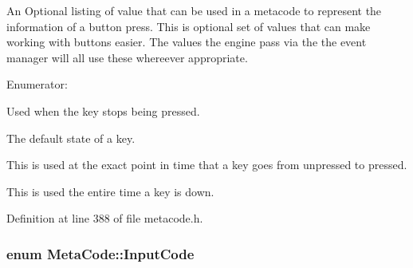 An Optional listing of value that can be used in a metacode to represent the information of a button press. This is optional set of values that can make working with buttons easier. The values the engine pass via the the event manager will all use these whereever appropriate. \begin{Desc}
\item[Enumerator: ]\par
\begin{description}
\item[{\em 
\hypertarget{classMetaCode_a8bcce67af20f4f779ba6f5387e438077aa16bc921174974d9e30752eff7af8336}{
BUTTON\_\-LIFTING}
\label{d7/d72/classMetaCode_a8bcce67af20f4f779ba6f5387e438077aa16bc921174974d9e30752eff7af8336}
}]Used when the key stops being pressed. \item[{\em 
\hypertarget{classMetaCode_a8bcce67af20f4f779ba6f5387e438077a87e2c9bdb3c969158f85543759dce244}{
BUTTON\_\-UP}
\label{d7/d72/classMetaCode_a8bcce67af20f4f779ba6f5387e438077a87e2c9bdb3c969158f85543759dce244}
}]The default state of a key. \item[{\em 
\hypertarget{classMetaCode_a8bcce67af20f4f779ba6f5387e438077a1113791ce46932b93099ba765116b0d7}{
BUTTON\_\-PRESSING}
\label{d7/d72/classMetaCode_a8bcce67af20f4f779ba6f5387e438077a1113791ce46932b93099ba765116b0d7}
}]This is used at the exact point in time that a key goes from unpressed to pressed. \item[{\em 
\hypertarget{classMetaCode_a8bcce67af20f4f779ba6f5387e438077a73ef49474af25ad4c503fe27420c6448}{
BUTTON\_\-DOWN}
\label{d7/d72/classMetaCode_a8bcce67af20f4f779ba6f5387e438077a73ef49474af25ad4c503fe27420c6448}
}]This is used the entire time a key is down. \end{description}
\end{Desc}



Definition at line 388 of file metacode.h.\hypertarget{classMetaCode_a7390e6f58e25c0ce377bba4e63081b24}{
\subsubsection[{InputCode}]{\setlength{\rightskip}{0pt plus 5cm}enum {\bf MetaCode::InputCode}}}
\label{d7/d72/classMetaCode_a7390e6f58e25c0ce377bba4e63081b24}


